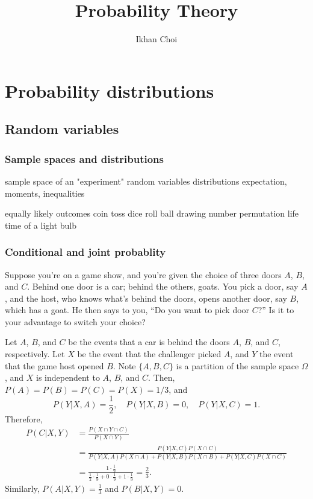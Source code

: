 \documentclass{../note}
\begin{document}
\title{Probability Theory}
\author{Ikhan Choi}
\maketitle
\tableofcontents


\part{Probability distributions}
\chapter{Random variables}

\section{Sample spaces and distributions}


sample space of an "experiment"
random variables
distributions
expectation, moments, inequalities

equally likely outcomes
	coin toss
	dice roll
	ball drawing
	number permutation
	life time of a light bulb


\section{Conditional and joint probablity}

\begin{prb}
Suppose you're on a game show, and you're given the choice of three doors $A$, $B$, and $C$.
Behind one door is a car; behind the others, goats.
You pick a door, say $A$, and the host, who knows what's behind the doors, opens another door, say $B$, which has a goat.
He then says to you, ``Do you want to pick door $C$?''
Is it to your advantage to switch your choice?
\end{prb}
\begin{pf}
Let $A$, $B$, and $C$ be the events that a car is behind the doors $A$, $B$, and $C$, respectively.
Let $X$ be the event that the challenger picked $A$, and $Y$ the event that the game host opened $B$.
Note $\{A,B,C\}$ is a partition of the sample space $\Omega$, and $X$ is independent to $A$, $B$, and $C$.
Then, $P(A)=P(B)=P(C)=P(X)=1/3$, and
\[P(Y|X,A)=\frac12,\quad P(Y|X,B)=0,\quad P(Y|X,C)=1.\]
Therefore,
\begin{align*}
P(C|X,Y)&=\frac{P(X\cap Y\cap C)}{P(X\cap Y)}\\
&=\frac{P(Y|X,C)P(X\cap C)}{P(Y|X,A)P(X\cap A)+P(Y|X,B)P(X\cap B)+P(Y|X,C)P(X\cap C)}\\
&=\frac{1\cdot \frac19}{\frac12\cdot\frac19+0\cdot\frac19+1\cdot\frac19}=\frac23.
\end{align*}
Similarly, $P(A|X,Y)=\frac13$ and $P(B|X,Y)=0$.
\end{pf}
\end{document}
